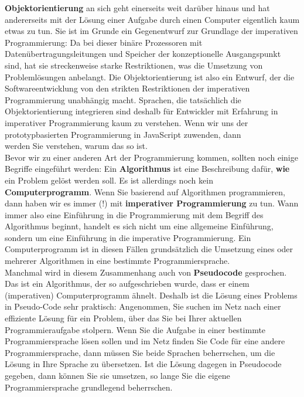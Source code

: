 \textbf{Objektorientierung} an sich geht einerseits weit darüber hinaus und hat andererseits mit der Lösung einer Aufgabe durch einen Computer eigentlich kaum etwas zu tun. Sie ist im Grunde ein Gegenentwurf zur Grundlage der imperativen Programmierung: Da bei dieser binäre Prozessoren mit Datenübertragungsleitungen und Speicher der konzeptionelle Ausgangspunkt sind, hat sie streckenweise starke Restriktionen, was die Umsetzung von Problemlösungen anbelangt. Die Objektorientierung ist also ein Entwurf, der die Softwareentwicklung von den strikten Restriktionen der imperativen Programmierung unabhängig macht. Sprachen, die tatsächlich die Objektorientierung integrieren sind deshalb für Entwickler mit Erfahrung in imperativer Programmierung kaum zu verstehen. Wenn wir uns der prototypbasierten Programmierung in JavaScript zuwenden, dann\\
werden Sie verstehen, warum das so ist.\\

Bevor wir zu einer anderen Art der Programmierung kommen, sollten noch einige Begriffe eingeführt werden: Ein \textbf{Algorithmus} ist eine Beschreibung dafür, \textbf{wie} ein Problem gelöst werden soll. Es ist allerdings noch kein \textbf{Computerprogramm}. Wenn Sie basierend auf Algorithmen programmieren,\\
dann haben wir es immer (!) mit \textbf{imperativer Programmierung}  zu tun. Wann immer also eine Einführung in die Programmierung mit dem Begriff des Algorithmus beginnt, handelt es sich nicht um eine allgemeine Einführung, sondern um eine Einführung in die imperative Programmierung. Ein Computerprogramm ist in diesen Fällen grundsätzlich die Umsetzung eines oder mehrerer Algorithmen in eine bestimmte Programmiersprache.\\

Manchmal wird in diesem Zusammenhang auch von \textbf{Pseudocode} gesprochen. Das ist ein Algorithmus, der so aufgeschrieben wurde, dass er einem (imperativen) Computerprogramm ähnelt. Deshalb ist die Lösung eines Problems in Pseudo-Code sehr praktisch: Angenommen, Sie suchen im Netz nach einer effiziente Lösung für ein Problem, über das Sie bei Ihrer aktuellen Programmieraufgabe stolpern. Wenn Sie die Aufgabe in einer bestimmte Programmiersprache lösen sollen und im Netz finden Sie Code für eine andere Programmiersprache, dann müssen Sie beide Sprachen beherrschen, um die Lösung in Ihre Sprache zu übersetzen. Ist die Lösung dagegen in Pseudocode gegeben, dann können Sie sie umsetzen, so lange Sie die eigene Programmiersprache grundlegend beherrschen.\\

